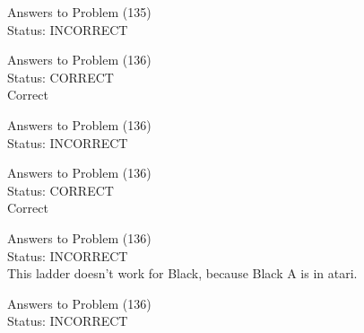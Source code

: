 \documentclass[11pt]{article}
\begin{document}
\begin{minipage}[t]{0.5\textwidth}
  {\centering
  
  Answers to Problem (135)\\
  Status: INCORRECT\\
  
  }
\end{minipage}
\begin{minipage}[t]{0.5\textwidth}
  {\centering
  
  Answers to Problem (136)\\
  Status: CORRECT\\
  Correct\\
  }
\end{minipage}
\begin{minipage}[t]{0.5\textwidth}
  {\centering
  
  Answers to Problem (136)\\
  Status: INCORRECT\\
  
  }
\end{minipage}
\begin{minipage}[t]{0.5\textwidth}
  {\centering
  
  Answers to Problem (136)\\
  Status: CORRECT\\
  Correct\\
  }
\end{minipage}
\begin{minipage}[t]{0.5\textwidth}
  {\centering
  
  Answers to Problem (136)\\
  Status: INCORRECT\\
  This ladder doesn't work for Black, because Black A is in atari.\\
  }
\end{minipage}
\begin{minipage}[t]{0.5\textwidth}
  {\centering
  
  Answers to Problem (136)\\
  Status: INCORRECT\\
  
  }
\end{minipage}
\end{document}
